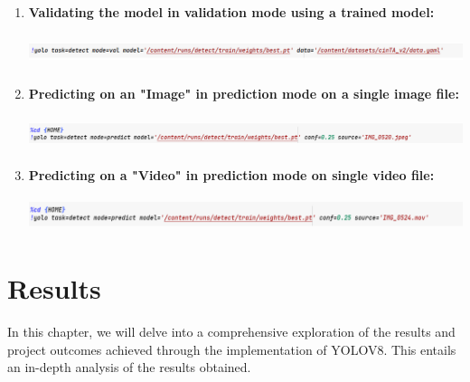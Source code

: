 \documentclass[12 pt]{report}
\begin{document}
{\begin{enumerate}
    \item \textbf{Validating the model in validation mode using a trained model:}
          \begin{center}
            \includegraphics[width=17cm, height=1cm]{validating the yolomodel on the dataset.png}
          \end{center}

    \item \textbf{Predicting on an "Image" in prediction mode on a single image file:}
          \begin{center}
            \includegraphics[width=17cm, height=1cm]{Testing the model on real-world img.png}
          \end{center}

    \item \textbf{Predicting on a "Video" in prediction mode on single video file:}
          \begin{center}
            \includegraphics[width=17cm, height=1cm]{Testing the model on real-world video.png}
          \end{center}

  \end{enumerate}
 }


\newpage
\chapter{Results}
\justify
 {
  In this chapter, we will delve into a comprehensive exploration of the results and project outcomes achieved through the implementation of YOLOV8. This entails an in-depth analysis of the results obtained.
 }
\end{document}
